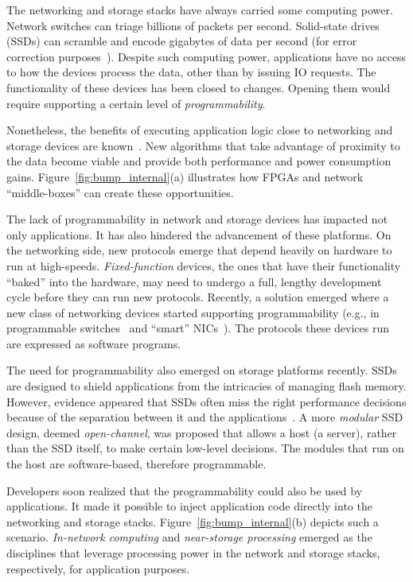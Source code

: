\documentclass[11pt,dvipdfmx]{article}
\begin{document}
The networking and storage stacks have always carried some computing power.
Network switches can triage billions of packets per second.
Solid-state drives (SSDs) can scramble and encode gigabytes of data per second
(for error correction purposes~\cite{cai17}).
Despite such computing power, applications have no access to how the
devices process the data, other than by issuing IO requests.
The functionality of these devices has been closed to changes.  Opening them
would require supporting a certain level of \emph{programmability}.


Nonetheless, the benefits of executing application logic close to networking and
storage devices are known~\cite{fang19, teubner13}.
New algorithms that take advantage of proximity to the data become viable and
provide both performance and power consumption gains.
Figure~\ref{fig:bump_internal}(a) illustrates how FPGAs and network
``middle-boxes'' can create these opportunities.


The lack of programmability in network and storage devices has impacted not
only applications.
It has also hindered the advancement of these platforms.
On the networking side, new protocols emerge that depend heavily on hardware to
run at high-speeds.
\emph{Fixed-function} devices, the ones that have their functionality ``baked''
into the hardware, may need to undergo a full, lengthy development cycle before
they can run new protocols.
Recently, a solution emerged where a new class of networking devices started
supporting programmability (e.g., in programmable switches~\cite{bosshart13} and
``smart'' NICs~\cite{zilberman14}).
The protocols these devices run are expressed as software programs.


The need for programmability also emerged on storage platforms recently.
SSDs are designed to shield applications from the intricacies of managing
flash memory.
However, evidence appeared that SSDs often miss the right performance decisions
because of the separation between it and the
applications~\cite{bjorling17}.
A more \emph{modular} SSD design, deemed \emph{open-channel}, was proposed that
allows a host (a server), rather than the SSD itself, to make certain low-level
decisions.
The modules that run on the host are software-based, therefore programmable.


Developers soon realized that the programmability could also be used by
applications.
It made it possible to inject application code directly into the networking and
storage stacks.
Figure~\ref{fig:bump_internal}(b) depicts such a scenario.
\emph{In-network computing} and \emph{near-storage processing} emerged as the
disciplines that leverage processing power in the network and storage stacks,
respectively, for application purposes.
\end{document}
